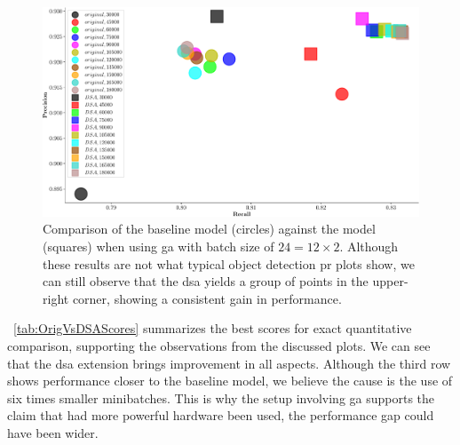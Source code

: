 \begin{figure}[t]
    \centerline{\includegraphics[width=\linewidth]{figures/siamese_tracking/tracker_cmp_160_2x12_vs_160_2x2_DSA_GA_rec_prec.pdf}}
    \caption[\gls{dsa} evaluation with \gls{ga} - secondary metrics]{Comparison of the baseline model (circles) against the \dsamodel{} model (squares) when using \gls{ga} with batch size of $24 = 12 \times 2$. Although these results are not what typical object detection \gls{pr} plots show, we can still observe that the \gls{dsa} yields a group of points in the upper-right corner, showing a consistent gain in performance.}
    \label{fig:OrigVsDSA_160RPN_GA_Prec_Rec}
\end{figure}

\tabletext{}~\ref{tab:OrigVsDSAScores} summarizes the best scores for exact quantitative comparison, supporting the observations from the discussed plots. We can see that the \gls{dsa} extension brings improvement in all aspects. Although the third row shows performance closer to the baseline model, we believe the cause is the use of six times smaller minibatches. This is why the setup involving \gls{ga} supports the claim that had more powerful hardware been used, the performance gap could have been wider.


